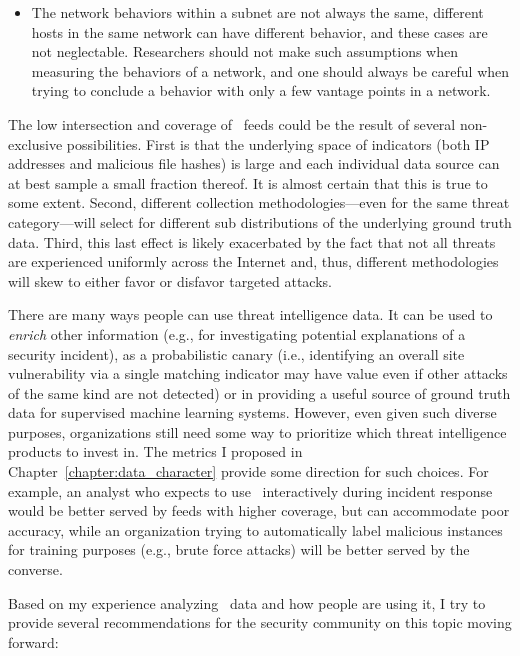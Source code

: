 \begin{itemize}
    \item The network behaviors within a subnet are not always the same, 
    different hosts in the same network can have different behavior, and 
    these cases are not neglectable. Researchers should not make such 
    assumptions when measuring the behaviors of a network, and one should
    always be careful when trying to conclude a behavior with only a few
    vantage points in a network.
    
\end{itemize}

The low intersection and coverage of \ti\ feeds could be the result of
several non-exclusive possibilities. First is that the underlying space 
of indicators (both IP addresses and malicious file hashes) is large and 
each individual data source can at best sample a small fraction thereof.  
It is almost certain that this is true to some extent. Second, different collection methodologies---even for the same threat category---will select 
for different sub distributions of the underlying ground truth data.
Third, this last effect is likely exacerbated by the fact that not all
threats are experienced uniformly across the Internet and, thus,
different methodologies will skew to either favor or disfavor targeted
attacks.

There are many ways people can use threat intelligence data.
It can be used to \emph{enrich} other information
(e.g., for investigating potential explanations of a security
incident), as a probabilistic canary (i.e., identifying an overall
site vulnerability via a single matching indicator may have value even
if other attacks of the same kind are not detected) or in providing a
useful source of ground truth data for supervised machine learning
systems. However, even given such diverse purposes, organizations still 
need some way to prioritize which threat intelligence products to invest 
in. The metrics I proposed in Chapter~\ref{chapter:data_character} 
provide some direction for such choices. For example, an analyst who 
expects to use \ti\ interactively during incident response would be better
served by feeds with higher coverage, but can accommodate poor accuracy, 
while an organization trying to automatically label malicious instances 
for training purposes (e.g., brute force attacks) will be better served by 
the converse.

Based on my experience analyzing \ti\ data and how people are using it, 
I try to provide several recommendations for the security community on this
topic moving forward:

